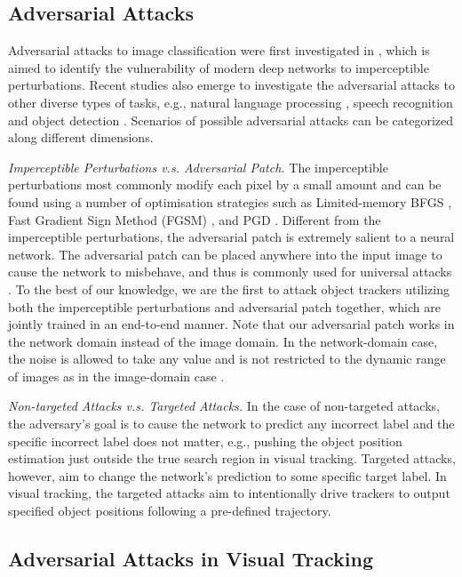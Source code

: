 \documentclass{article}
\newcommand{\eg}{e.g.}
\begin{document}
\subsection{Adversarial Attacks}

Adversarial attacks to image classification were first investigated in \cite{intriguing}, which is aimed to identify the vulnerability of modern deep networks to imperceptible perturbations. Recent studies also emerge to investigate the adversarial attacks to other diverse types of tasks, \eg, natural language processing \cite{generating}, speech recognition \cite{imperceptible} and object detection \cite{wei2019transferable}.
Scenarios of possible adversarial attacks can be categorized along different dimensions.

\textit{Imperceptible Perturbations v.s. Adversarial Patch.} The imperceptible perturbations most commonly modify each pixel by a small amount and can be found using a number of optimisation strategies such as Limited-memory BFGS \cite{intriguing}, Fast Gradient Sign Method (FGSM) \cite{FGSM}, and PGD \cite{PGD}.
Different from the imperceptible perturbations, the adversarial patch is extremely salient to a neural network. The adversarial patch can be placed anywhere into the input image to cause the network to misbehave, and thus is commonly used for universal attacks \cite{patch}.
To the best of our knowledge, we are the first to attack object trackers utilizing both the imperceptible perturbations and adversarial patch together, which are jointly trained in an end-to-end manner.
Note that our adversarial patch works in the network domain instead of the image domain. In the network-domain case, the noise is allowed to take any value and is not restricted to the dynamic range of images as in the image-domain case \cite{karmon2018lavan}.

\textit{Non-targeted Attacks v.s. Targeted Attacks.} In the case of non-targeted attacks, the adversary's goal is to cause the network to predict any incorrect label and the specific incorrect label does not matter, \eg, pushing the object position estimation just outside the true search region in visual tracking.
Targeted attacks, however, aim to change the network's prediction to some specific target label. In visual tracking, the targeted attacks aim to intentionally drive trackers to output specified object positions following a pre-defined trajectory.

\subsection{Adversarial Attacks in Visual Tracking}
\end{document}

